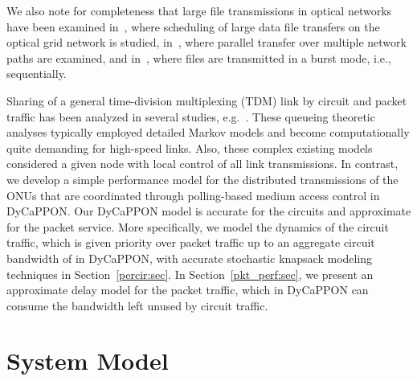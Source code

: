 \documentclass[article]{IEEEtran}
\begin{document}
We also note for completeness that large file transmissions
in optical networks have been examined in~\cite{DSAlgfle},
where scheduling of large
data file transfers on the optical grid network is studied,
in~\cite{LgfleMulp}, where
parallel transfer over multiple network paths are examined, and
in~\cite{EIBT}, where files are transmitted in
a burst mode, i.e., sequentially.

Sharing of a general time-division multiplexing (TDM) link by
circuit and packet traffic has been analyzed in several
studies,
e.g.~\cite{bolla97,gaver82,ghani1994decomp,li1985perf,mag82,mankus92,wein80}.
These queueing theoretic analyses typically employed detailed Markov
models and become computationally quite demanding for high-speed
links. Also, these complex existing models considered a given node
with local control of all link transmissions. In contrast, we
develop a simple performance model for the distributed transmissions
of the ONUs that are coordinated through polling-based medium access
control in DyCaPPON. Our DyCaPPON model is accurate for the circuits
and approximate for the packet service. More specifically, we model
the dynamics of the circuit traffic, which is given priority over
packet traffic up to an aggregate circuit bandwidth of  in
DyCaPPON, with accurate stochastic knapsack modeling techniques in
Section~\ref{percir:sec}. In Section~\ref{pkt_perf:sec}, we present
an approximate delay model for the packet traffic, which in DyCaPPON
can consume the bandwidth left unused by circuit traffic.


\section{System Model}
\label{sec:model}
\end{document}
